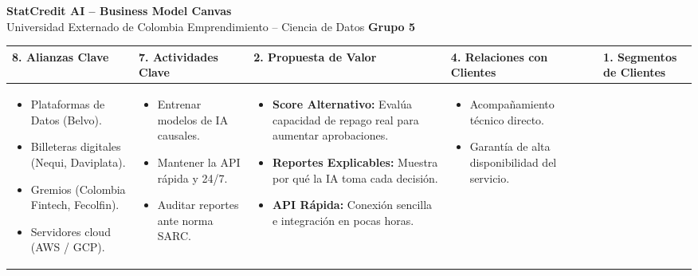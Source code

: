 \documentclass[10pt,a4paper,landscape]{article}
\begin{document}
\pagestyle{empty}

\begin{center}
    {\huge\bfseries StatCredit AI -- Business Model Canvas}\\[0.15cm]
    {\large Universidad Externado de Colombia \:\vert\: Emprendimiento -- Ciencia de Datos \:\vert\: \textbf{Grupo 5}}
\end{center}

\vspace{0.3cm}

\small

\renewcommand{\arraystretch}{1.2}
\begin{table}[h!]
\centering
\begin{tabularx}{\linewidth}{|X|X|X|X|X|}
\hline
\rowcolor{lightgray}
\textbf{8. Alianzas Clave} & 
\textbf{7. Actividades Clave} & 
\textbf{2. Propuesta de Valor} & 
\textbf{4. Relaciones con Clientes} & 
\textbf{1. Segmentos de Clientes} \\ 
\hline
\begin{itemize}
    \item Plataformas de Datos (Belvo).
    \item Billeteras digitales (Nequi, Daviplata).
    \item Gremios (Colombia Fintech, Fecolfin).
    \item Servidores cloud (AWS / GCP).
\end{itemize} & 
\begin{itemize}
    \item Entrenar modelos de IA causales.
    \item Mantener la API rápida y 24/7.
    \item Auditar reportes ante norma SARC.
\end{itemize} & 
\begin{itemize}
    \item \textbf{Score Alternativo:} Evalúa capacidad de repago real para aumentar aprobaciones.
    \item \textbf{Reportes Explicables:} Muestra por qué la IA toma cada decisión.
    \item \textbf{API Rápida:} Conexión sencilla e integración en pocas horas.
\end{itemize} & 
\begin{itemize}
    \item Acompañamiento técnico directo.
    \item Garantía de alta disponibilidad del servicio.

\end{itemize}
\end{tabularx}
\end{table}
\end{document}
